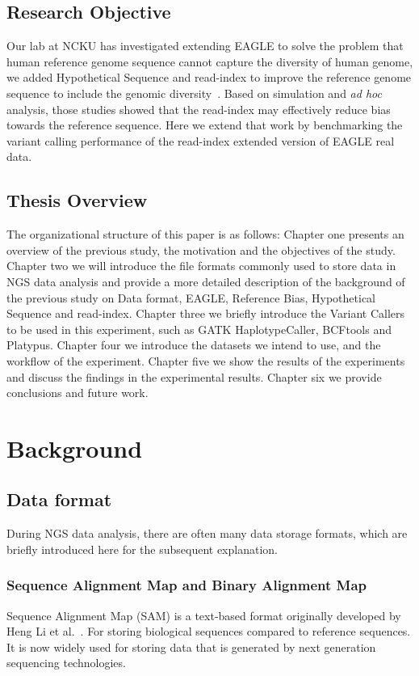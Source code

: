 \documentclass[PhD]{PHlab-thesis}
\begin{document}
\section{Research Objective}
Our lab at NCKU has investigated extending EAGLE to solve the problem that human reference genome sequence cannot capture the diversity of human genome, we added Hypothetical Sequence and read-index to improve the reference genome sequence to include the genomic diversity~\cite{Chou2020HS, Su2021RI}.  Based on simulation and \textit{ad hoc} analysis, those studies showed that the read-index may effectively reduce bias towards the reference sequence.  Here we extend that work by benchmarking the variant calling performance of the read-index extended version of EAGLE real data.

\section{Thesis Overview}
The organizational structure of this paper is as follows: Chapter one presents an overview of the previous study, the motivation and the objectives of the study. Chapter two we will introduce the file formats commonly used to store data in NGS data analysis and provide a more detailed description of the background of the previous study on Data format, EAGLE, Reference Bias, Hypothetical Sequence and read-index. Chapter three we briefly introduce the Variant Callers to be used in this experiment, such as GATK HaplotypeCaller, BCFtools and Platypus. Chapter four we introduce the datasets we intend to use, and the workflow of the experiment. Chapter five we show the results of the experiments and discuss the findings in the experimental results. Chapter six we provide conclusions and future work.

\chapter{Background}
\section{Data format}
During NGS data analysis, there are often many data storage formats, which are briefly introduced here for the subsequent explanation.
\subsection{Sequence Alignment Map and Binary Alignment Map}
Sequence Alignment Map (SAM) is a text-based format originally developed by Heng Li et al.~\cite{li2009SAMtools}. For storing biological sequences compared to reference sequences. It is now widely used for storing data that is generated by next generation sequencing technologies.
\end{document}
